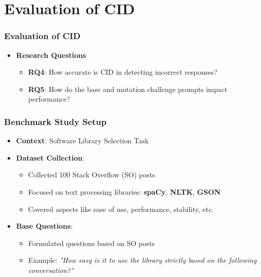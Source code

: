\section{Evaluation of CID}

\begin{frame}
  \frametitle{Evaluation of CID}
  \begin{itemize}
    \item \textbf{Research Questions}
    \begin{itemize}
      \item \textbf{RQ4}: How accurate is CID in detecting incorrect responses?
      \item \textbf{RQ5}: How do the base and mutation challenge prompts impact performance?
    \end{itemize}
  \end{itemize}
\end{frame}

\begin{frame}
  \frametitle{Benchmark Study Setup}
  \begin{itemize}
    \item \textbf{Context}: Software Library Selection Task
    \item \textbf{Dataset Collection}:
    \begin{itemize}
      \item Collected 100 Stack Overflow (SO) posts
      \item Focused on text processing libraries: \textbf{spaCy}, \textbf{NLTK}, \textbf{GSON}
      \item Covered aspects like ease of use, performance, stability, etc.
    \end{itemize}
    \item \textbf{Base Questions}:
    \begin{itemize}
      \item Formulated questions based on SO posts
      \item Example: \textit{"How easy is it to use the library strictly based on the following conversation?"}
    \end{itemize}
  \end{itemize}
\end{frame}


